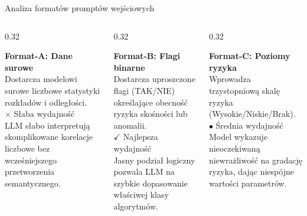 \documentclass[9pt,aspectratio=169]{beamer}
\begin{document}
\begin{frame}{Analiza formatów promptów wejściowych}
\begin{columns}[T]
\begin{column}{0.32\textwidth}
\begin{cardpurple}
\textbf{Format-A: Dane surowe}\\[4pt]
\footnotesize Dostarcza modelowi surowe liczbowe statystyki rozkładów i odległości.\\[3pt]
{\color{red!70!black}\footnotesize $\times$ Słaba wydajność}\\[3pt]
\footnotesize LLM słabo interpretują skomplikowane korelacje liczbowe bez wcześniejszego przetworzenia semantycznego.
\end{cardpurple}
\end{column}
\begin{column}{0.32\textwidth}
\begin{cardgreen}
\textbf{Format-B: Flagi binarne}\\[4pt]
\footnotesize Dostarcza uproszczone flagi (TAK/NIE) określające obecność ryzyka skośności lub anomalii.\\[3pt]
{\color{accentgreen}\footnotesize $\checkmark$ Najlepsza wydajność}\\[3pt]
\footnotesize Jasny podział logiczny pozwala LLM na szybkie dopasowanie właściwej klasy algorytmów.
\end{cardgreen}
\end{column}
\begin{column}{0.32\textwidth}
\begin{cardorange}
\textbf{Format-C: Poziomy ryzyka}\\[4pt]
\footnotesize Wprowadza trzystopniową skalę ryzyka (Wysokie/Niskie/Brak).\\[3pt]
{\color{accentorange}\footnotesize $\bullet$ Średnia wydajność}\\[3pt]
\footnotesize Model wykazuje nieoczekiwaną niewrażliwość na gradację ryzyka, dając niespójne wartości parametrów.
\end{cardorange}
\end{column}
\end{columns}
\end{frame}
\end{document}

